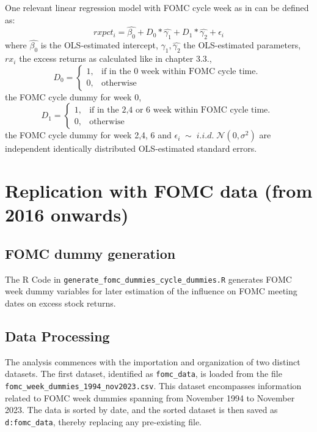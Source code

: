 One relevant linear regression model with FOMC cycle week as in \parencite{cieslak_stock_2019} can be defined as:
\begin{equation}
	rxpct_{i}=\hat{\beta_{0}}+D_0*\hat{\gamma_{1}}+D_1*\hat{\gamma_{2}}+\epsilon_i
\end{equation}
where
$ { \hat{\beta_{0}} } $ is the OLS-estimated intercept,
$ { \hat{\gamma_{1}}, \hat{\gamma_{2}} } $ the OLS-estimated parameters,
${ rx_{i} } $ the excess returns as calculated like in chapter 3.3., 
\begin{equation}
    D_0=
    \begin{cases}
      1, & \text{if in the 0 week within FOMC cycle time. }\\
      0, & \text{otherwise}
    \end{cases}
\end{equation}
the FOMC cycle dummy for week 0, 
\begin{equation}
    D_1=
    \begin{cases}
      1, & \text{if in the 2,4 or 6 week within FOMC cycle time. } \\
      0, & \text{otherwise}
    \end{cases}
\end{equation}
the FOMC cycle dummy for week 2,4, 6 and
$ { \epsilon_i \; \sim \; i.i.d.  \; \mathcal{N}\left(0, \sigma^2 \right) } $
are independent identically distributed OLS-estimated standard errors. 


\section{Replication with FOMC data (from 2016 onwards)}

\subsection{FOMC dummy generation}

The R Code in \texttt{generate\_fomc\_dummies\_cycle\_dummies.R}
generates FOMC week dummy variables for later estimation of the influence on FOMC meeting dates on excess stock returns.

\subsection{Data Processing}

The analysis commences with the importation and organization of two distinct datasets. 
The first dataset, identified as \texttt{fomc\_data}, is loaded from the file\\ \texttt{fomc\_week\_dummies\_1994\_nov2023.csv}. 
This dataset encompasses information related to FOMC week dummies spanning from November 1994 to November 2023. The data is sorted by date, and the sorted dataset is then saved as \texttt{d:fomc\_data}, thereby replacing any pre-existing file.

